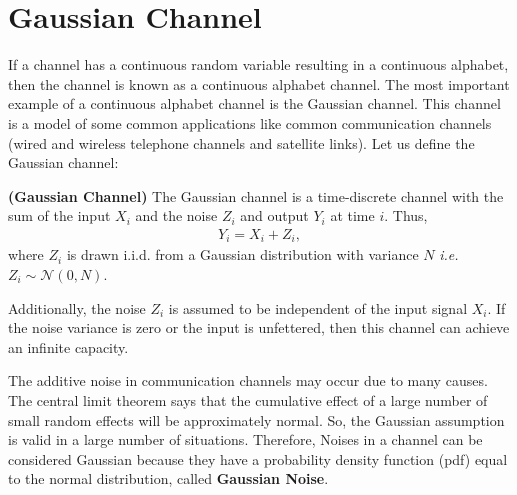 \section{Gaussian Channel}
If a channel has a continuous random variable resulting in a continuous alphabet, then the channel is known as a continuous alphabet channel. The most important example of a continuous alphabet channel is the Gaussian channel. This channel is a model of some common applications like common communication channels (wired and wireless telephone channels and satellite links). Let us define the Gaussian channel:
%
\begin{tcolorbox}[boxrule=0pt,frame hidden,sharp corners,enhanced, opacityback=0, borderline west={2pt}{0pt}{red}]
\begin{defn} \textbf{(Gaussian Channel)} The Gaussian channel is a time-discrete channel with the sum of the input $X_i$ and the noise $Z_i$ and output $Y_i$ at time $i$. Thus,
%
\begin{eqnarray}
    Y_i = X_i+Z_i,
\end{eqnarray}
%
where $Z_i$ is drawn i.i.d. from a Gaussian distribution with variance $N$ \textit{i.e.} $Z_i \sim \mathcal{N}(0, N)$.
\end{defn}
\end{tcolorbox}
%
Additionally, the noise $Z_i$ is assumed to be independent of the input signal $X_i$. If the noise variance is zero or the input is unfettered, then this channel can achieve an infinite capacity.
%
\begin{tcolorbox}[enhanced,
  colback=green!0!black!0!white,colframe=black!15!blue,title=Why Noises can be considered as Gaussian?]
The additive noise in communication channels may occur due to many causes. The central limit theorem says that the cumulative effect of a large number of small random effects will be approximately normal. So, the Gaussian assumption is valid in a large number of situations. Therefore, Noises in a channel can be considered Gaussian because they have a probability density function (pdf) equal to the normal distribution, called \textbf{Gaussian Noise}.
\end{tcolorbox}
%
